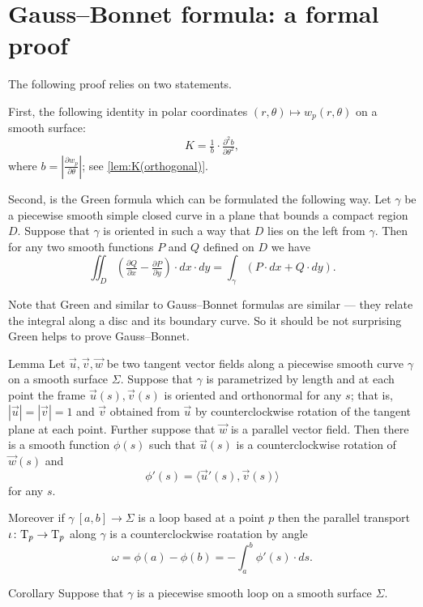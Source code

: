 \section*{Gauss--Bonnet formula: a formal proof}\label{page:gauss--bonnet:formal}

The following proof relies on two statements.

First, the following identity in polar coordinates $(r,\theta)\mapsto w_p(r,\theta)$ on a smooth surface:
\[K=\tfrac1b\cdot\tfrac{\partial^2 b}{\partial \theta^2},\]
where $b=|\tfrac{\partial w_p}{\partial \theta}|$; see \ref{lem:K(orthogonal)}.

Second, is the Green formula which can be formulated the following way.
Let $\gamma$ be a piecewise smooth simple closed curve in a plane that bounds a compact region $D$.
Suppose that $\gamma$ is oriented in such a way that $D$ lies on the left from $\gamma$.
Then for any two smooth functions $P$ and $Q$ defined on $D$ we have
\[\iint_D (\tfrac{\partial Q}{\partial x}-\tfrac{\partial P}{\partial y})\cdot dx\cdot dy=\int_\gamma (P\cdot dx+Q\cdot dy).\]

Note that Green and similar to Gauss--Bonnet formulas are similar --- they relate the integral along a disc and its boundary curve.
So it should be not surprising Green helps to prove Gauss--Bonnet.

\begin{thm}{Lemma}
Let $\vec u,\vec v,\vec w$ be two tangent vector fields along a piecewise smooth curve $\gamma$ on a smooth surface $\Sigma$.
Suppose that $\gamma$ is parametrized by length and
at each point the frame $\vec u(s),\vec v(s)$ is oriented and orthonormal for any $s$;
that is, $|\vec u|=|\vec v|=1$ and $\vec v$ obtained from $\vec u$ by counterclockwise rotation of the tangent plane at each point.
Further suppose that $\vec w$ is a parallel vector field.
Then there is a smooth function $\phi(s)$ such that $\vec u(s)$ is a counterclockwise rotation of $\vec w(s)$ and
\[\phi'(s)=\langle\vec u'(s),\vec v(s)\rangle\]
for any $s$.

Moreover if $\gamma\:[a,b]\to\Sigma$ is a loop based at a point $p$ then the parallel transport $\iota\colon\mathrm{T}_p\to\mathrm{T}_p$ along $\gamma$ is a counterclockwise roatation by angle
\[\omega=\phi(a)-\phi(b)=-\int_a^b\phi'(s)\cdot ds.\]
\end{thm}

\begin{thm}{Corollary}
Suppose that $\gamma$ is a piecewise smooth loop on a smooth surface $\Sigma$.
\end{thm}

